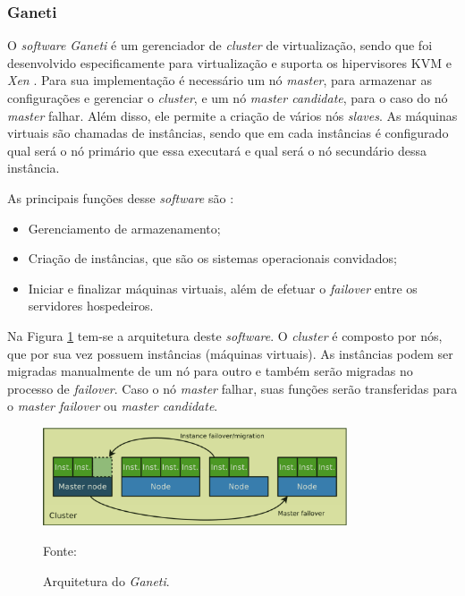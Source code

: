 \subsubsection{Ganeti}
\label{section:ganeti}
O \textit{software} \textit{Ganeti} \cite{ganeti} é um gerenciador de \textit{cluster} de virtualização, sendo que foi desenvolvido 
especificamente para virtualização e suporta os hipervisores \ac{KVM} \cite{kvm} e \textit{Xen} \cite{xen}. Para sua implementação é necessário
um nó \textit{master}, para armazenar as configurações e gerenciar o \textit{cluster}, e um nó \textit{master candidate}, para o caso do 
nó \textit{master} falhar. Além disso, ele permite a criação de vários nós \textit{slaves}. As máquinas virtuais são chamadas de instâncias, 
sendo que em cada instâncias é configurado qual será o nó primário que essa executará e qual será o nó secundário dessa instância.

As principais funções desse \textit{software} são \cite{ganeti}:
\begin{itemize}
 \item Gerenciamento de armazenamento;
 \item Criação de instâncias, que são os sistemas operacionais convidados;
 \item Iniciar e finalizar máquinas virtuais, além de efetuar o \textit{failover} entre os servidores hospedeiros.
\end{itemize}

Na Figura \ref{fig:ganeti_arquitetura} tem-se a arquitetura deste \textit{software}. O \textit{cluster} é composto por nós, que por sua vez 
possuem instâncias (máquinas virtuais). As instâncias podem ser migradas manualmente de um nó para outro e também serão migradas no processo de
\textit{failover}. Caso o nó \textit{master} falhar, suas funções serão transferidas para o \textit{master failover} ou \textit{master candidate}.

\begin{figure}[h!]
 \centering
 \includegraphics[width=340px]{img/ganeti_arquitetura.eps}
 \caption{Arquitetura do \textit{Ganeti}.}
 Fonte: \citet{carvalho2011}
 \label{fig:ganeti_arquitetura}
\end{figure}

